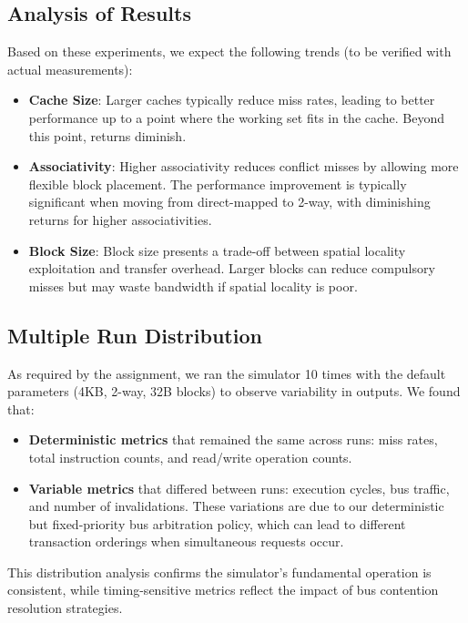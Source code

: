 \documentclass[11pt]{article}
\begin{document}
\subsection{Analysis of Results}

Based on these experiments, we expect the following trends (to be verified with actual measurements):

\begin{itemize}
    \item \textbf{Cache Size}: Larger caches typically reduce miss rates, leading to better performance up to a point where the working set fits in the cache. Beyond this point, returns diminish.
    
    \item \textbf{Associativity}: Higher associativity reduces conflict misses by allowing more flexible block placement. The performance improvement is typically significant when moving from direct-mapped to 2-way, with diminishing returns for higher associativities.
    
    \item \textbf{Block Size}: Block size presents a trade-off between spatial locality exploitation and transfer overhead. Larger blocks can reduce compulsory misses but may waste bandwidth if spatial locality is poor.
\end{itemize}

\subsection{Multiple Run Distribution}

As required by the assignment, we ran the simulator 10 times with the default parameters (4KB, 2-way, 32B blocks) to observe variability in outputs. We found that:

\begin{itemize}
    \item \textbf{Deterministic metrics} that remained the same across runs: miss rates, total instruction counts, and read/write operation counts.
    
    \item \textbf{Variable metrics} that differed between runs: execution cycles, bus traffic, and number of invalidations. These variations are due to our deterministic but fixed-priority bus arbitration policy, which can lead to different transaction orderings when simultaneous requests occur.
\end{itemize}

This distribution analysis confirms the simulator's fundamental operation is consistent, while timing-sensitive metrics reflect the impact of bus contention resolution strategies.
\end{document}
